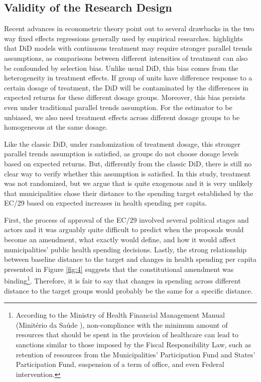 \subsection{Validity of the Research Design}

Recent advances in econometric theory point out to several drawbacks in the two way fixed effects regressions generally used by empirical researches. \cite{callaway2021difference} highlights that DiD models with continuous treatment may require stronger parallel trends assumptions, as comparisons between different intensities of treatment can also be confounded by selection bias. Unlike usual DiD, this bias comes from the heterogeneity in treatment effects. If group of units have difference response to a certain dosage of treatment, the DiD will be contaminated by the differences in expected returns for these different dosage groups. Moreover, this bias persists even under traditional parallel trends assumption. For the estimator to be unbiased, we also need treatment effects across different dosage groups to be homogeneous at the same dosage. 

Like the classic DiD, under randomization of treatment dosage, this stronger parallel trends assumption is satisfied, as groups do not choose dosage levels based on expected returns. But, differently from the classic DiD, there is still no clear way to verify whether this assumption is satisfied. In this study, treatment was not randomized, but we argue that is quite exogenous and it is very unlikely that municipalities chose their distance to the spending target established by the EC/29 based on expected increases in health spending per capita. 

First, the process of approval of the EC/29 involved several political stages and actors and it was arguably quite difficult to predict when the proposals would become an amendment, what exactly would define, and how it would affect municipalities' public health spending decisions. Lastly, the strong relationship between baseline distance to the target and changes in health spending per capita presented in Figure \ref{fig:4} suggests that the constitutional amendment was binding\footnote{According to the Ministry of Health Financial Management Manual (Minitério da Saúde \citeyear{msmanual}), non-compliance with the minimum amount of resources that should be spent in the provision of healthcare can lead to sanctions similar to those imposed by the Fiscal Responsibility Law, such as retention of resources from the Municipalities’ Participation Fund and States’ Participation Fund, suspension of a term of office, and even Federal intervention.}. Therefore, it is fair to say that changes in spending across different distance to the target groups would probably be the same for a specific distance.

